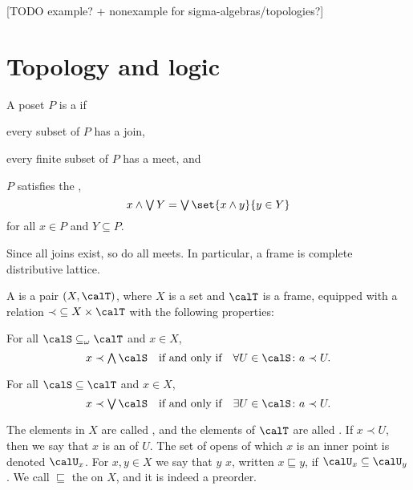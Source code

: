 \documentclass[a4paper, 11pt, article, danish, oneside]{memoir}
\newcommand{\meet}{\land}
\DeclareMathOperator*{\smallbigvee}{\textstyle\bigvee}
\DeclareMathOperator*{\bigjoin}{\mathchoice
    {\smallbigvee}%
    {\bigvee}%
    {\bigvee}%
    {\bigvee}%
}
\DeclareMathOperator*{\smallbigwedge}{\textstyle\bigwedge}
\DeclareMathOperator*{\bigmeet}{\mathchoice
    {\smallbigwedge}%
    {\bigwedge}%
    {\bigwedge}%
    {\bigwedge}%
}
\renewcommand{\prod}{\times}
\begin{document}
[TODO example? + nonexample for sigma-algebras/topologies?]


\section{Topology and logic}

\begin{definition}[Frames]
    A poset $P$ is a  if
    \begin{enumdef}
        \item every subset of $P$ has a join,
        \item every finite subset of $P$ has a meet, and
        \item $P$ satisfies the ,
        \begin{equation*}
            x \meet \bigjoin Y
                = \bigjoin \set{x \meet y}{y \in Y}
        \end{equation*}
        for all $x \in P$ and $Y \subseteq P$.
    \end{enumdef}
\end{definition}
%
Since all joins exist, so do all meets. In particular, a frame is complete distributive lattice.

\newcommand{\inpoint}{\prec}
\newcommand{\opens}[1]{\calU_{#1}}
\newcommand{\specs}{\sqsubseteq}

\begin{definition}
    A  is a pair $(X,\calT)$, where $X$ is a set and $\calT$ is a frame, equipped with a relation ${\inpoint} \subseteq X \prod \calT$ with the following properties:
    \begin{enumdef}
        \item For all $\calS \subseteq_\omega \calT$ and $x \in X$,
        \begin{equation*}
            x \inpoint \bigmeet \calS
                \quad \text{if and only if} \quad
                \forall U \in \calS \colon a \inpoint U.
        \end{equation*}

        \item For all $\calS \subseteq \calT$ and $x \in X$,
        \begin{equation*}
            x \inpoint \bigjoin \calS
                \quad \text{if and only if} \quad
                \exists U \in \calS \colon a \inpoint U.
        \end{equation*}
    \end{enumdef}
\end{definition}
%
The elements in $X$ are called , and the elements of $\calT$ are alled . If $x \inpoint U$, then we say that $x$ is an  of $U$. The set of opens of which $x$ is an inner point is denoted $\opens{x}$. For $x,y \in X$ we say that $y$  $x$, written $x \specs y$, if $\opens{x} \subseteq \opens{y}$. We call $\specs$ the  on $X$, and it is indeed a preorder.
\end{document}
